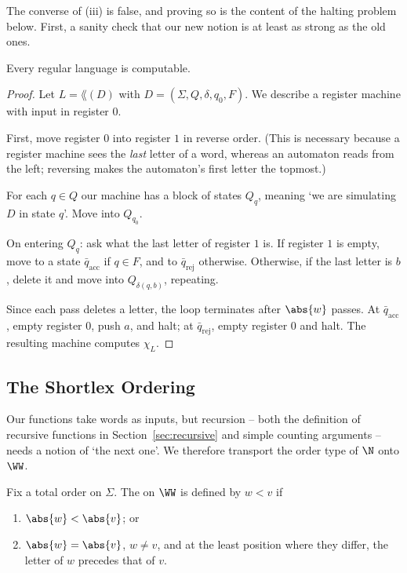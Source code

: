 The converse of (iii) is false, and proving so is the content of the halting problem below. First, a sanity check that our new notion is at least as strong as the old ones.

\begin{theorem}\label{thm:regularcomputable}
	Every regular language is computable.
\end{theorem}

\begin{proof}
	Let $L = \lang(D)$ with $D = (\Sigma, Q, \delta, q_0, F)$. We describe a register machine with input in register $0$.

	First, move register $0$ into register $1$ in reverse order. (This is necessary because a register machine sees the \emph{last} letter of a word, whereas an automaton reads from the left; reversing makes the automaton's first letter the topmost.)

	For each $q \in Q$ our machine has a block of states $Q_q$, meaning `we are simulating $D$ in state $q$'. Move into $Q_{q_0}$.

	On entering $Q_q$: ask what the last letter of register $1$ is. If register $1$ is empty, move to a state $\bar q_{\mathrm{acc}}$ if $q \in F$, and to $\bar q_{\mathrm{rej}}$ otherwise. Otherwise, if the last letter is $b$, delete it and move into $Q_{\delta(q,b)}$, repeating.

	Since each pass deletes a letter, the loop terminates after $\abs{w}$ passes. At $\bar q_{\mathrm{acc}}$, empty register $0$, push $a$, and halt; at $\bar q_{\mathrm{rej}}$, empty register $0$ and halt. The resulting machine computes $\chi_L$.
\end{proof}

\subsection{The Shortlex Ordering}

Our functions take words as inputs, but recursion -- both the definition of recursive functions in Section~\ref{sec:recursive} and simple counting arguments -- needs a notion of `the next one'. We therefore transport the order type of $\N$ onto $\WW$.

\begin{definition}[Shortlex]
	Fix a total order on $\Sigma$. The  on $\WW$ is defined by $w < v$ if
	\begin{enumerate}[label=(\roman*)]
		\item $\abs{w} < \abs{v}$; or
		\item $\abs{w} = \abs{v}$, $w \neq v$, and at the least position where they differ, the letter of $w$ precedes that of $v$.
	\end{enumerate}
\end{definition}

